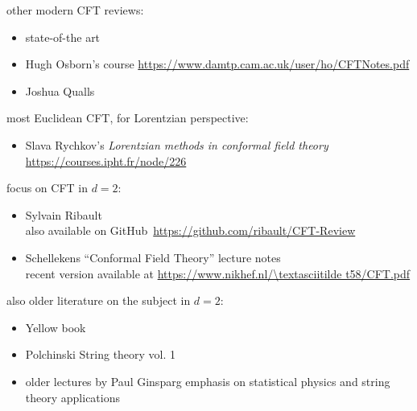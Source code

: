 \documentclass[a4paper,12pt]{article}
\numberwithin{equation}{section}
\begin{document}

other modern CFT reviews:

\begin{itemize}

\item
state-of-the art
\cite{Poland:2018epd}

\item
Hugh Osborn's course 
\url{https://www.damtp.cam.ac.uk/user/ho/CFTNotes.pdf}

\item
Joshua Qualls \cite{Qualls:2015qjb}

\end{itemize}


most Euclidean CFT, for Lorentzian perspective:
\begin{itemize}

\item
Slava Rychkov's \emph{Lorentzian methods in conformal field theory}
\url{https://courses.ipht.fr/node/226}


\end{itemize}


focus on CFT in $d = 2$:
\begin{itemize}

\item
Sylvain Ribault \cite{Ribault:2014hia} \\
also available on GitHub~\url{https://github.com/ribault/CFT-Review}

\item
Schellekens ``Conformal Field Theory'' lecture notes~\cite{Schellekens:1996tg} \\
recent version available at
\url{https://www.nikhef.nl/\textasciitilde t58/CFT.pdf}

\end{itemize}

also older literature on the subject  in $d = 2$:
\begin{itemize}

\item
Yellow book
\cite{DiFrancesco:1997nk}

\item
Polchinski String theory vol. 1
\cite{Polchinski:1998rq}

\item
older lectures by Paul Ginsparg
\cite{Ginsparg:1988ui}
emphasis on statistical physics and string theory applications

\end{itemize}
\end{document}

